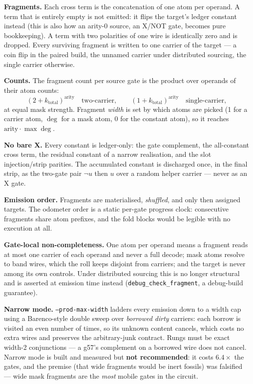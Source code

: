 \documentclass[11pt]{article}
\newcommand{\code}[1]{\texttt{#1}}
\begin{document}
\textbf{Fragments.} Each cross term is the concatenation of one atom per
operand. A term that is entirely empty is not emitted: it flips the target's
ledger constant instead (this is also how an arity-0 source, an X/NOT gate,
becomes pure bookkeeping). A term with two polarities of one wire is
identically zero and is dropped. Every surviving fragment is written to one
carrier of the target --- a coin flip in the paired build, the unnamed carrier
under distributed sourcing, the single carrier otherwise.

\textbf{Counts.} The fragment count per source gate is the product over
operands of their atom counts:
\[
(2 + k_{\mathrm{total}})^{\text{arity}} \quad\text{two-carrier},
\qquad
(1 + k_{\mathrm{total}})^{\text{arity}} \quad\text{single-carrier},
\]
at equal mask strength. Fragment \emph{width} is set by which atoms are picked
(1 for a carrier atom, $\deg$ for a mask atom, 0 for the constant atom), so it
reaches $\text{arity} \cdot \max\deg$.

\textbf{No bare X.} Every constant is ledger-only: the gate complement, the
all-constant cross term, the residual constant of a narrow realisation, and the
slot injection/strip parities. The accumulated constant is discharged once, in
the final strip, as the two-gate pair $\lnot u$ then $u$ over a random helper
carrier --- never as an X gate.

\textbf{Emission order.} Fragments are materialised, \emph{shuffled}, and only
then assigned targets. The odometer order is a static per-gate progress clock:
consecutive fragments share atom prefixes, and the fold blocks would be legible
with no execution at all.

\textbf{Gate-local non-completeness.} One atom per operand means a fragment
reads at most one carrier of each operand and never a full decode; mask atoms
resolve to band wires, which the roll keeps disjoint from carriers; and the
target is never among its own controls. Under distributed sourcing this is no
longer structural and is asserted at emission time instead
(\code{debug\_check\_fragment}, a debug-build guarantee).

\textbf{Narrow mode.} \code{--prod-max-width} ladders every emission down to a
width cap using a Barenco-style double sweep over \emph{borrowed dirty}
carriers: each borrow is visited an even number of times, so its unknown
content cancels, which costs no extra wires and preserves the arbitrary-junk
contract. Rungs must be exact width-2 conjunctions --- a g57's complement on a
borrowed wire does not cancel. Narrow mode is built and measured but
\textbf{not recommended}: it costs $6.4\times$ the gates, and the premise
(that wide fragments would be inert fossils) was falsified --- wide mask
fragments are the \emph{most} mobile gates in the circuit.
\end{document}
